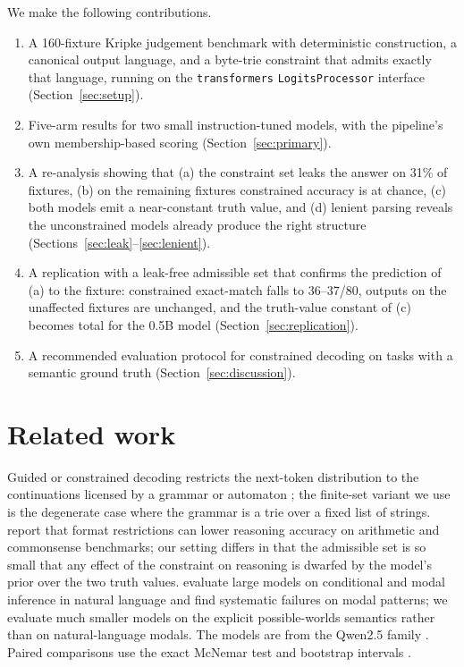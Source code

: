 \documentclass[11pt]{article}
\begin{document}
We make the following contributions.
\begin{enumerate}
  \item A 160-fixture Kripke judgement benchmark with deterministic construction, a canonical output language, and a byte-trie constraint that admits exactly that language, running on the \texttt{transformers} \texttt{LogitsProcessor} interface (Section~\ref{sec:setup}).
  \item Five-arm results for two small instruction-tuned models, with the pipeline's own membership-based scoring (Section~\ref{sec:primary}).
  \item A re-analysis showing that (a) the constraint set leaks the answer on 31\% of fixtures, (b) on the remaining fixtures constrained accuracy is at chance, (c) both models emit a near-constant truth value, and (d) lenient parsing reveals the unconstrained models already produce the right structure (Sections~\ref{sec:leak}--\ref{sec:lenient}).
  \item A replication with a leak-free admissible set that confirms the prediction of (a) to the fixture: constrained exact-match falls to 36--37/80, outputs on the unaffected fixtures are unchanged, and the truth-value constant of (c) becomes total for the 0.5B model (Section~\ref{sec:replication}).
  \item A recommended evaluation protocol for constrained decoding on tasks with a semantic ground truth (Section~\ref{sec:discussion}).
\end{enumerate}

\section{Related work}

Guided or constrained decoding restricts the next-token distribution to the continuations licensed by a grammar or automaton \citep{willard2023outlines,geng2023grammar}; the finite-set variant we use is the degenerate case where the grammar is a trie over a fixed list of strings. \citet{tam2024speak} report that format restrictions can lower reasoning accuracy on arithmetic and commonsense benchmarks; our setting differs in that the admissible set is so small that any effect of the constraint on reasoning is dwarfed by the model's prior over the two truth values. \citet{holliday2024modal} evaluate large models on conditional and modal inference in natural language and find systematic failures on modal patterns; we evaluate much smaller models on the explicit possible-worlds semantics rather than on natural-language modals. The models are from the Qwen2.5 family \citep{qwen2.5}. Paired comparisons use the exact McNemar test \citep{mcnemar1947} and bootstrap intervals \citep{efron1993bootstrap}.
\end{document}
